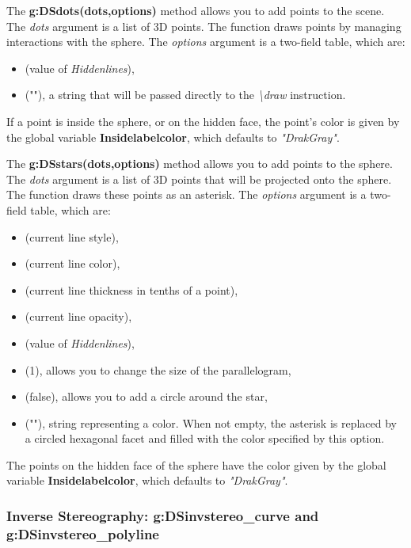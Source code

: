 The \textbf{g:DSdots(dots,options)} method allows you to add points to the scene. The \emph{dots} argument is a list of 3D points. The function draws points by managing interactions with the sphere. The \emph{options} argument is a two-field table, which are:
\begin{itemize}
    \item {} (value of \emph{Hiddenlines}),
    \item {} (""), a string that will be passed directly to the \emph{\textbackslash draw} instruction.
\end{itemize}
If a point is inside the sphere, or on the hidden face, the point's color is given by the global variable \textbf{Insidelabelcolor}, which defaults to \emph{"DrakGray"}.

The \textbf{g:DSstars(dots,options)} method allows you to add points to the sphere. The \emph{dots} argument is a list of 3D points that will be projected onto the sphere. The function draws these points as an asterisk. The \emph{options} argument is a two-field table, which are:
\begin{itemize}
    \item {} (current line style),
    \item {} (current line color),
    \item {} (current line thickness in tenths of a point),
    \item {} (current line opacity),
    \item {} (value of \emph{Hiddenlines}),
    \item {} (1), allows you to change the size of the parallelogram,
    \item {} (false), allows you to add a circle around the star,
    \item {} (""), string representing a color. When not empty, the asterisk is replaced by a circled hexagonal facet and filled with the color specified by this option. \end{itemize}
The points on the hidden face of the sphere have the color given by the global variable \textbf{Insidelabelcolor}, which defaults to \emph{"DrakGray"}.

\subsubsection{Inverse Stereography: g:DSinvstereo\_curve and g:DSinvstereo\_polyline}

